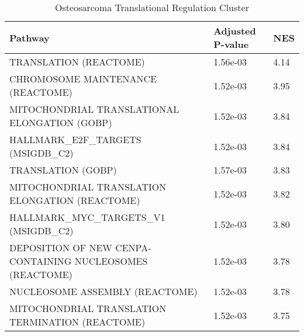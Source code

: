 \documentclass[varwidth=1000pt,border=10pt,convert={size=640x}]{standalone}
\begin{document}
	\begin{table}[h]
		\caption{Osteosarcoma Translational Regulation Cluster}
		\begin{tabular}{L{10cm}R{1.5cm}R{1.5cm}}
			\toprule
			Pathway &      Adjusted P-value &   NES \\
			\midrule
			TRANSLATION (REACTOME) &  1.56e-03 &  4.14 \\
			CHROMOSOME MAINTENANCE (REACTOME) &  1.52e-03 &  3.95 \\
			MITOCHONDRIAL TRANSLATIONAL ELONGATION (GOBP) &  1.52e-03 &  3.84 \\
			HALLMARK\_E2F\_TARGETS (MSIGDB\_C2) &  1.52e-03 &  3.84 \\
			TRANSLATION (GOBP) &  1.57e-03 &  3.83 \\
			MITOCHONDRIAL TRANSLATION ELONGATION (REACTOME) &  1.52e-03 &  3.82 \\
			HALLMARK\_MYC\_TARGETS\_V1 (MSIGDB\_C2) &  1.52e-03 &  3.80 \\
			DEPOSITION OF NEW CENPA-CONTAINING NUCLEOSOMES (REACTOME) &  1.52e-03 &  3.78 \\
			NUCLEOSOME ASSEMBLY (REACTOME) &  1.52e-03 &  3.78 \\
			MITOCHONDRIAL TRANSLATION TERMINATION (REACTOME) &  1.52e-03 &  3.75 \\
			\bottomrule
		\end{tabular}
	\end{table}
\end{document}
